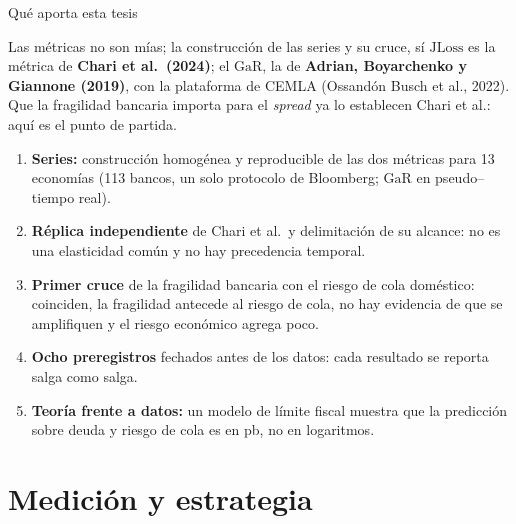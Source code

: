 \documentclass[aspectratio=169]{beamer}
\newcommand{\JLoss}{\mathrm{JLoss}}
\newcommand{\GaR}{\mathrm{GaR}}
\begin{document}
\begin{frame}{Qué aporta esta tesis}
\small
\begin{block}{Las métricas no son mías; la construcción de las series y su cruce, sí}
\footnotesize $\JLoss$ es la métrica de \textbf{Chari et al.\ (2024)}; el $\GaR$, la de \textbf{Adrian, Boyarchenko y Giannone (2019)}, con la plataforma de CEMLA (Ossandón Busch et al., 2022). Que la fragilidad bancaria importa para el \textit{spread} ya lo establecen Chari et al.: aquí es el punto de partida.
\end{block}
\begin{enumerate}\setlength\itemsep{2pt}
\item \textbf{Series:} construcción homogénea y reproducible de las dos métricas para 13 economías (113 bancos, un solo protocolo de Bloomberg; $\GaR$ en pseudo--tiempo real).
\item \textbf{Réplica independiente} de Chari et al.\ y delimitación de su alcance: no es una elasticidad común y no hay precedencia temporal.
\item \textbf{Primer cruce} de la fragilidad bancaria con el riesgo de cola doméstico: coinciden, la fragilidad antecede al riesgo de cola, no hay evidencia de que se amplifiquen y el riesgo económico agrega poco.
\item \textbf{Ocho preregistros} fechados antes de los datos: cada resultado se reporta salga como salga.
\item \textbf{Teoría frente a datos:} un modelo de límite fiscal muestra que la predicción sobre deuda y riesgo de cola es en pb, no en logaritmos.
\end{enumerate}
\end{frame}

\section{Medición y estrategia}
\end{document}
